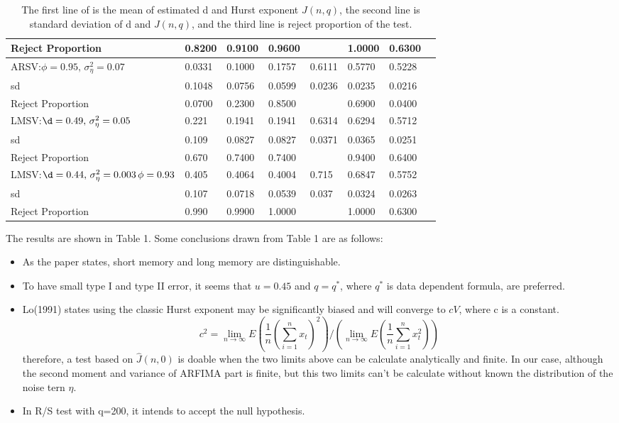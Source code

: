 \documentclass[10pt,a4paper]{article}
\begin{document}
\begin{table}[!hbp]
\begin{tabular}{llllllll}
Reject Proportion &  0.8200 &  0.9100 &  0.9600 &\,  &  1.0000 & 0.6300\\
\hline
ARSV:$\phi=0.95,\,\sigma_\eta^2=0.07$ & 0.0331 & 0.1000 &  0.1757 & 0.6111  &  0.5770 & 0.5228 \\
sd & 0.1048 & 0.0756  & 0.0599 & 0.0236  &  0.0235 & 0.0216\\
Reject Proportion & 0.0700 & 0.2300 &  0.8500 & \, &  0.6900 & 0.0400\\
LMSV:$\d=0.49,\,\sigma_\eta^2=0.05$ &  0.221 & 0.1941  & 0.1941 & 0.6314 &    0.6294 & 0.5712 \\
sd& 0.109 & 0.0827 &  0.0827 & 0.0371  &  0.0365 & 0.0251\\
Reject Proportion &  0.670 &  0.7400 &  0.7400 & \,  &  0.9400 & 0.6400\\
\hline
LMSV:$\d=0.44,\,\sigma_\eta^2=0.003\,\phi =0.93$ &   0.405 & 0.4064 &  0.4004 & 0.715  &  0.6847 & 0.5752 \\
sd& 0.107 & 0.0718 &  0.0539 & 0.037  &  0.0324 & 0.0263\\
Reject Proportion &  0.990 & 0.9900  & 1.0000 &\,  &  1.0000 & 0.6300\\
\hline
\end{tabular}
\caption{The first line of is the mean of estimated d and Hurst exponent $J(n,q)$, the second line is standard deviation of d and $J(n,q)$, and the third line is reject proportion of the test.}
\end{table}

The results are shown in Table 1. Some conclusions drawn from Table 1 are as follows:
\begin{itemize}
\item {As the paper states, short memory and long memory are distinguishable.}
\item {To have small type I and type II error, it seems that $u=0.45$  and $q=q^*$, where $q^*$ is data dependent formula, are preferred.}
\item {Lo(1991)\cite{lo1989long} states using the classic Hurst exponent may be significantly biased and will converge to  $cV$, where c is a constant. $$c^2=\lim_{n\to\infty}E(\frac{1}{n}(\sum_{i=1}^{n}x_t)^2)/(\lim_{n\to\infty}E(\frac{1}{n}\sum_{i=1}^{n}x_t^2))$$therefore, a test based on $\hat{J}(n,0)$ is doable when the two limits above can be calculate analytically and finite. In our case, although the second moment and variance of ARFIMA part is finite, but this two limits can't be calculate without known the distribution of the noise tern $\eta$.}
\item{In R/S test with q=200, it intends to accept the null hypothesis.}
\end{itemize}
\end{document}
